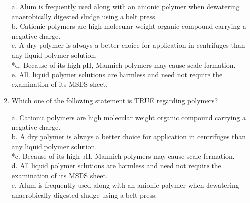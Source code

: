 \begin{enumerate}
a. Alum is frequently used along with an anionic polymer when dewatering anaerobically digested sludge using a belt press. \\
b. Cationic polymers are high-molecular-weight organic compound carrying a negative charge. \\
c. A dry polymer is always a better choice for application in centrifuges than any liquid polymer solution. \\
*d. Because of its high pH, Mannich polymers may cause scale formation. \\
e. All. liquid polymer solutions are harmless and need not require the examination of its MSDS sheet. 

\item  Which one of the following statement is TRUE regarding polymers? 

a. Cationic polymers are high molecular weight organic compound carrying a negative charge. \\
b. A dry polymer is always a better choice for application in centrifuges than any liquid polymer solution. \\
*c. Because of its high pH, Mannich polymers may cause scale formation. \\
d. All liquid polymer solutions are harmless and need not require the examination of its MSDS sheet. \\
e. Alum is frequently used along with an anionic polymer when dewatering anaerobically digested sludge using a belt press. 


\end{enumerate}